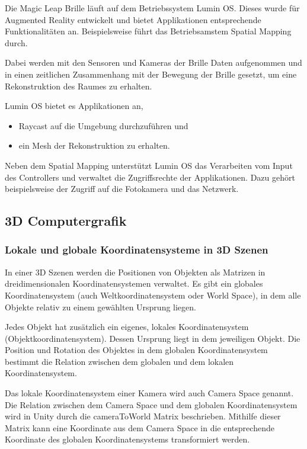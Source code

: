 \documentclass[german,a4paper, 12pt]{llncs}
\begin{document}
Die Magic Leap Brille läuft auf dem Betriebssystem Lumin OS. Dieses wurde für Augmented Reality entwickelt und bietet Applikationen entsprechende Funktionalitäten an. Beispielsweise führt das Betriebsamstem Spatial Mapping durch.\cite{mlluminOS,mlluminfeatures}

Dabei werden mit den Sensoren und Kameras der Brille Daten aufgenommen und in einen zeitlichen Zusammenhang mit der Bewegung der Brille gesetzt, um eine Rekonstruktion des Raumes zu erhalten.\cite{mlluminOS,mlluminfeatures,mlluminworldreconstruktion,mlmeshingunity}

Lumin OS bietet es Applikationen an,
\begin{itemize}
	\item Raycast auf die Umgebung durchzuführen und
	\item ein Mesh der Rekonstruktion zu erhalten.
\end{itemize}
Neben dem Spatial Mapping unterstützt Lumin OS das Verarbeiten vom Input des Controllers und verwaltet die Zugriffsrechte der Applikationen. Dazu gehört beispielsweise der Zugriff auf die Fotokamera und das Netzwerk.\cite{mlluminfeatures,mlappsecurity}

\subsection{3D Computergrafik}

\subsubsection{Lokale und globale Koordinatensysteme in 3D Szenen}
In einer 3D Szenen werden die Positionen von Objekten als Matrizen in dreidimensionalen Koordinatensystemen verwaltet.
Es gibt ein globales Koordinatensystem (auch Weltkoordinatensystem oder World Space), in dem alle Objekte relativ zu einem gewählten Ursprung liegen. 

Jedes Objekt hat zusätzlich ein eigenes, lokales Koordinatensystem (Objektkoordinatensystem). Dessen Ursprung liegt in dem jeweiligen Objekt.
Die Position und Rotation des Objektes in dem globalen Koordinatensystem bestimmt die Relation zwischen dem globalen und dem lokalen Koordinatensystem. 

Das lokale Koordinatensystem einer Kamera wird auch Camera Space genannt. Die Relation zwischen dem Camera Space und dem globalen Koordinatensystem wird in Unity durch die cameraToWorld Matrix beschrieben. Mithilfe dieser Matrix kann eine Koordinate aus dem Camera Space in die entsprechende Koordinate des globalen Koordinatensystems transformiert werden.\cite{unitycameratoworldmatrix}
\end{document}
